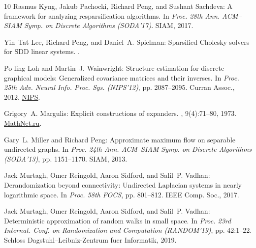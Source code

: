 \documentclass[11pt]{article}
\numberwithin{equation}{section}
\theoremstyle{definition}
\theoremstyle{plain}
\numberwithin{myalgctr}{section}
\theoremstyle{named}
\begin{document}
\begin{thebibliography}{10}
{\sc Rasmus Kyng, Jakub Pachocki, Richard Peng, and Sushant Sachdeva}: A
  framework for analyzing resparsification algorithms.
\newblock In {\em Proc. 28th Ann. ACM--SIAM Symp. on Discrete Algorithms
  (SODA'17)}. SIAM, 2017.

{\sc Yin~Tat Lee, Richard Peng, and Daniel~A. Spielman}: Sparsified {C}holesky
  solvers for {SDD} linear systems.
.

{\sc Po-ling Loh and Martin~J. Wainwright}: Structure estimation for discrete
  graphical models: {G}eneralized covariance matrices and their inverses.
\newblock In {\em Proc. 25th Adv. Neural Info. Proc. Sys. (NIPS'12)}, pp.
  2087--2095. Curran Assoc., 2012.
\newblock
  \href{http://papers.nips.cc/paper/4584-structure-estimation-for-discrete-graphical-models-generalized-covariance-matrices-and-their-inverses.pdf}{NIPS}.

{\sc Grigory~A. Margulis}: Explicit constructions of expanders.
, 9(4):71--80, 1973.
\newblock
  \href{http://www.mathnet.ru/php/archive.phtml?wshow=paper&jrnid=ppi&paperid=925&option_lang=eng}{MathNet.ru}.

{\sc Gary~L. Miller and Richard Peng}: Approximate maximum flow on separable
  undirected graphs.
\newblock In {\em Proc. 24th Ann. ACM--SIAM Symp. on Discrete Algorithms
  (SODA'13)}, pp. 1151--1170. SIAM, 2013.
\newblock [\epfmtdoi{10.1137/1.9781611973105.83}]

{\sc Jack Murtagh, Omer Reingold, Aaron Sidford, and Salil~P. Vadhan}:
  Derandomization beyond connectivity: {U}ndirected {L}aplacian systems in
  nearly logarithmic space.
\newblock In {\em Proc. 58th FOCS}, pp. 801--812. IEEE Comp. Soc., 2017.

{\sc Jack Murtagh, Omer Reingold, Aaron Sidford, and Salil~P. Vadhan}:
  Deterministic approximation of random walks in small space.
\newblock In {\em Proc. 23rd Internat. Conf. on Randomization and Computation
  (RANDOM'19)}, pp. 42:1--22. Schloss Dagstuhl--Leibniz-Zentrum fuer
  Informatik, 2019.


\end{thebibliography}
\end{document}
